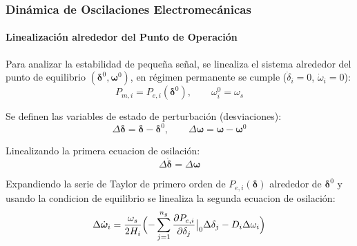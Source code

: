 \documentclass{beamer}
\begin{document}


\begin{frame}
 \frametitle{Dinámica de Oscilaciones Electromecánicas}
 \framesubtitle{Linealización alrededor del Punto de Operación}

 Para analizar la estabilidad de pequeña señal, se linealiza el sistema alrededor del punto de equilibrio
 $(\boldsymbol{\delta}^0, \boldsymbol{\omega}^0)$, en régimen permanente se cumple ($\dot{\delta}_i = 0$, $\dot{\omega}_i = 0$): 
 \begin{equation}
    P_{m,i} = P_{e,i}(\boldsymbol{\delta}^0), \qquad \omega_i^0 = \omega_s  
 \end{equation}

Se definen las variables de estado de perturbación (desviaciones):
 \begin{equation}
    \Delta\boldsymbol{\delta} = \boldsymbol{\delta} - \boldsymbol{\delta}^0, \qquad
    \Delta\boldsymbol{\omega} = \boldsymbol{\omega} - \boldsymbol{\omega}^0
 \end{equation}

\end{frame}
\begin{frame}
    Linealizando la primera ecuacion de osilación:
    \begin{equation}
        \Delta\dot{\boldsymbol{\delta}} = \Delta\boldsymbol{\omega}
    \end{equation}

 Expandiendo la serie de Taylor de primero orden de $P_{e,i}(\boldsymbol{\delta})$ alrededor de $\boldsymbol{\delta}^0$ y usando la condicion de equilibrio se linealiza la segunda ecuacion de osilación:
 \begin{equation}
    \Delta\dot{\boldsymbol{\omega}}_i = \frac{\omega_s}{2H_i}\Bigl(-\sum_{j=1}^{n_g} \frac{\partial P_{e,i}}{\partial \delta_j}\big|_0 \Delta\delta_j - D_i \Delta\omega_i\Bigr)
  \end{equation}
    
\end{frame}
\end{document}
